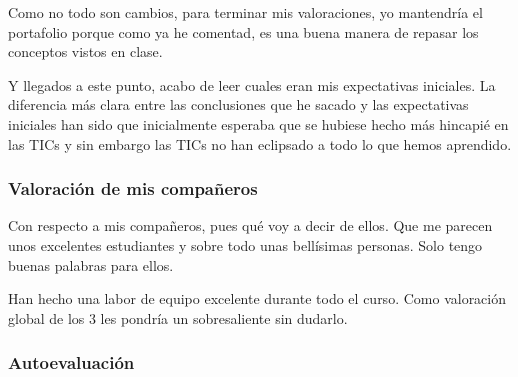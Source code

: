 \begin{leftbar}{\guscolor}
Como no todo son cambios, para terminar mis valoraciones, yo mantendría el portafolio porque como ya he comentad, es una buena manera de repasar los conceptos vistos en clase.

Y llegados a este punto, acabo de leer cuales eran mis expectativas iniciales. La diferencia más clara entre las conclusiones que he sacado y las expectativas iniciales han sido que inicialmente esperaba que se hubiese hecho más hincapié en las TICs y sin embargo las TICs no han eclipsado a todo lo que hemos aprendido.

\subsubsection{Valoración de mis compañeros}
Con respecto a mis compañeros, pues qué voy a decir de ellos. Que me parecen unos excelentes estudiantes y sobre todo unas bellísimas personas. Solo tengo buenas palabras para ellos.

Han hecho una labor de equipo excelente durante todo el curso. Como valoración global de los 3 les pondría un sobresaliente sin dudarlo.

\subsubsection{Autoevaluación}

\end{leftbar}

